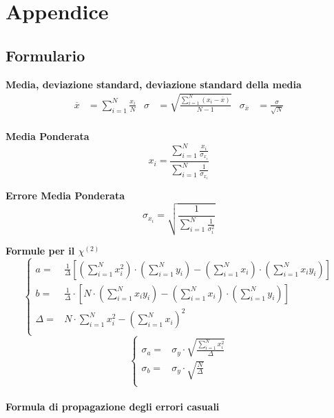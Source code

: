 \documentclass[a4paper,11pt,oneside]{article}
\begin{document}
\section{Appendice}

\subsection{Formulario}
\textbf{Media, deviazione standard, deviazione standard della media}
\begin{align*}
        \overline{x}&=\sum\limits_{i=1}^{N} \frac{x_{i}}{N}&
        \sigma&=\sqrt{\frac{\sum\limits_{i=1}^{N} (x_{i}-\overline{x})}{N-1}}&
        \sigma_{\overline{x}}&=\frac{\sigma}{\sqrt{N}}
\end{align*}\\

\textbf{Media Ponderata}
\begin{equation*}
\label{eq:media_pond}
    x_i=\frac{\sum_{i=1}^{N}\frac{x_i}{\sigma_{x_i}}}{\sum_{i=1}^{N}\frac{1}{\sigma_{x_i}}}
\end{equation*}

\textbf{Errore Media Ponderata}
\begin{equation*}
\label{eq:errore_media_pond}
     \sigma_{x_i}=\sqrt{\frac{1}{\sum_{i=1}^{N}\frac{1}{\sigma_{i}^{2}}}}
\end{equation*}

\textbf{Formule per il ${\chi}^{(2)}$}
\begin{equation*}
        \begin{cases}
    a=&\frac{1}{\Delta}[(\sum\limits_{i=1}^{N}{x_{i}^{2}})\cdot(\sum\limits_{i=1}^{N}{y_{i}})-(\sum\limits_{i=1}^{N}{x_{i}})\cdot(\sum\limits_{i=1}^{N}{x_{i}y_{i}})] \\ 
    b=&\frac{1}{\Delta }\cdot \left [N\cdot \left ( \sum\limits_{i=1}^{N}x_i y_i \right )-\left ( \sum\limits_{i=1}^{N}x_i \right )\cdot \left ( \sum\limits_{i=1}^{N}y_i \right )  \right ]\\
    \Delta=& N\cdot \sum\limits_{i=1}^{N} x_i^{2} - \left ( \sum\limits_{i=1}^{N}x_i \right )^{2}\\
    \end{cases}
\end{equation*}
\begin{equation*}
    \begin{cases}
    \sigma_{a}=&\sigma_{y}\cdot\sqrt{\frac{\sum_{i=1}^{N}{x_{i}^{2}}}{\Delta}} \\
    \sigma_{b}=&\sigma_y\cdot \sqrt{\frac{N}{\Delta }}\\
    \end{cases}
    \label{equation:err_chi_quadro}
\end{equation*}
\\
\textbf{Formula di propagazione degli errori casuali}\\
\end{document}
